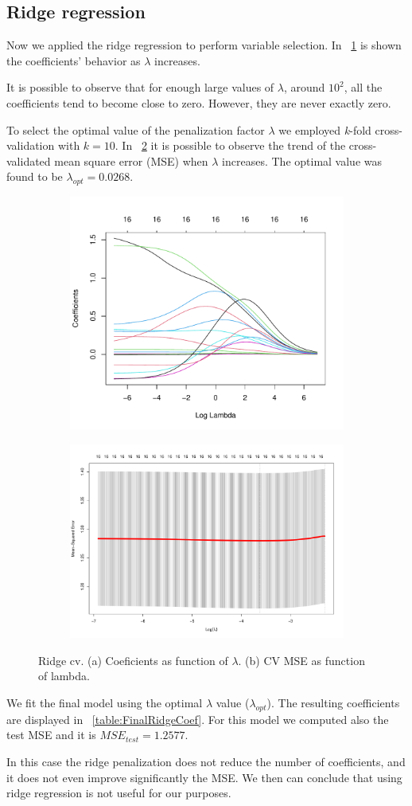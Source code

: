 \subsection{Ridge regression}

Now we applied the ridge regression to perform variable selection. In \Fig~\ref{fig:RidgeCoefVsLambda} is shown the coefficients' behavior as $\lambda$ increases. 

It is possible to observe that for enough large values of $\lambda$, around $10^2$, all the coefficients tend to become close to zero. However, they are never exactly zero.

To select the optimal value of the penalization factor $\lambda$ we employed \textit{k}-fold cross-validation with $\textit{k}=10$. In \Fig~\ref{fig:RidgeCvPlot} it is possible to observe the trend of the cross-validated mean square error (MSE) when $\lambda$ increases. The optimal value was found to be $\lambda_{opt} = 0.0268$.

\begin{figure}[H]
	\centering
	\begin{subfigure}{.5\textwidth}
		\centering
		\includegraphics[width=0.5\linewidth]{ImageFiles/Regression/Ridge/RidgeCoefVsLambda.pdf}
		\caption{}
		\label{fig:RidgeCoefVsLambda}
	\end{subfigure}%
	\begin{subfigure}{.5\textwidth}
		\centering
		\includegraphics[width=0.5\linewidth]{ImageFiles/Regression/Ridge/RidgeCvPlot.pdf}
		\caption{}
		\label{fig:RidgeCvPlot}
	\end{subfigure}
	\caption{Ridge cv. (a) Coeficients as function of $\lambda$. (b) CV MSE as function of lambda.}
	\label{fig:FinalFSSM}
\end{figure}

We fit the final model using the optimal $\lambda$ value ($\lambda_{opt}$). The resulting coefficients are displayed in \Tab~\ref{table:FinalRidgeCoef}. For this model we computed also the test MSE and it is $MSE_{test} = 1.2577$.

In this case the ridge penalization does not reduce the number of coefficients, and it does not even improve significantly the MSE. We then can conclude that using ridge regression is not useful for our purposes.
